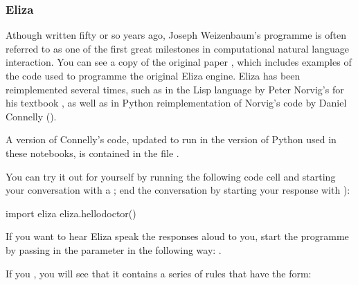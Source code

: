 \documentclass[letterpaper,10pt,english]{sphinxmanual}
\begin{document}
{\subsubsection{Eliza}
\label{\detokenize{content/03_Robot_Lab/Section_00_04:Eliza}}
Athough written fifty or so years ago, Joseph Weizenbaum’s  programme is often referred to as one of the first great milestones in computational natural language interaction. You can see a copy of the original paper , which includes examples of the code used to programme the original Eliza engine. Eliza has been reimplemented several times, such as in the Lisp language by Peter Norvig’s for his textbook , as well as in Python reimplementation of Norvig’s code by Daniel Connelly ().

A version of Connelly’s code, updated to run in the version of Python used in these notebooks, is contained in the file .

You can try it out for yourself by running the following code cell and starting your conversation with a ; end the conversation by starting your response with ):

{
\begin{sphinxVerbatim}[commandchars=\\\{\}]
\llap{\color{nbsphinxin}[ ]:\,\hspace{\fboxrule}\hspace{\fboxsep}}import eliza
eliza.hello\PYGZus{}doctor()
\end{sphinxVerbatim}
}

If you want to hear Eliza speak the responses aloud to you, start the programme by passing in the parameter  in the following way: .

If you , you will see that it contains a series of rules that have the form:

\begin{sphinxVerbatim}[commandchars=\\\{\}]
 \PYG{p}{[}
    \PYG{p}{]}
\end{sphinxVerbatim}

}
\end{document}
